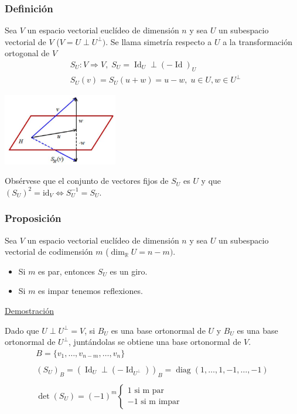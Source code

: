 \documentclass[12pt, a4paper, ones, notitlepage, openany,titlepage]{article}
\newcommand{\demostracion}{\noindent\underline{Demostración}}
\begin{document}
\subsubsection{Definición}
Sea $V$ un espacio vectorial euclídeo de dimensión $n$ y sea $U$ un subespacio vectorial de $V$ ($V = U \perp U^\perp)$. Se llama simetría respecto a $U$ a la transformación ortogonal de $V$
$$
\begin{aligned}
	& S_U : V \Longrightarrow V, \; S_U = \operatorname{Id}_U \perp(-\operatorname{Id})_U \\
	& S_U(v) = S_U(u + w) = u - w, \; u \in U, w \in U^\perp
\end{aligned}
$$
\begin{center}
	\includegraphics[max width=5cm]{2023_03_20_c2fe6c117849a1a0e8afg-053}
\end{center}
Obsérvese que el conjunto de vectores fijos de $S_{U}$ es $U$ y que $\left(S_{U}\right)^{2}=\mathrm{id}_{V} \Longleftrightarrow S_{U}^{-1}=S_{U}$.

\subsubsection{Proposición}
Sea $V$ un espacio vectorial euclídeo de dimensión $n$ y sea $U$ un subespacio vectorial de codimensión $m$ ($\operatorname{dim}_\mathbb{R}U = n - m)$.
\begin{itemize}
	\item Si $m$ es par, entonces $S_U$ es un giro.
	\item Si $m$ es impar tenemos reflexiones.
\end{itemize}

\demostracion

Dado que $U \perp U^\perp = V$, si $B_U$ es una base ortonormal de $U$ y $B_U$ es una base ortonormal de $U^\perp$, juntándolas se obtiene una base ortonormal de $V$.
\begin{gather*}
	B = \{v_1,\ldots,v_{n-m},\ldots,v_n\} \\\\
	(S_U)_B = (\operatorname{Id}_U \perp (-\operatorname{Id}_{U^\perp}))_B = \operatorname{diag}(1, \ldots, 1, -1, \ldots, -1) \\\\
	\operatorname{det}(S_U) = (-1)^m
	\begin{cases*}
		1 \text{ si m par} \\
		-1 \text{ si m impar}
	\end{cases*}
\end{gather*}
\end{document}
